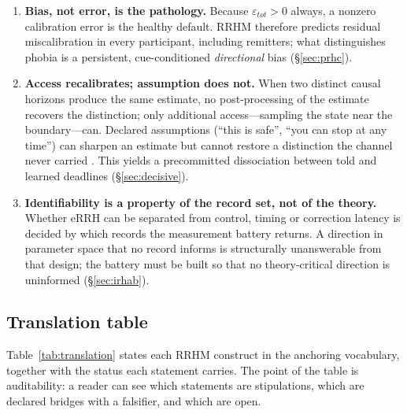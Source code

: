 \documentclass[9pt,twocolumn]{article}
\newcommand{\eRRH}{\mathrm{eRRH}}
\begin{document}
\begin{enumerate}[leftmargin=1.5em]
\item \textbf{Bias, not error, is the pathology.} Because $\varepsilon_{tot}>0$ always, a nonzero calibration error is the healthy default. RRHM therefore predicts residual miscalibration in every participant, including remitters; what distinguishes phobia is a persistent, cue-conditioned \emph{directional} bias (\S\ref{sec:prhc}).
\item \textbf{Access recalibrates; assumption does not.} When two distinct causal horizons produce the same estimate, no post-processing of the estimate recovers the distinction; only additional access---sampling the state near the boundary---can. Declared assumptions (``this is safe'', ``you can stop at any time'') can sharpen an estimate but cannot restore a distinction the channel never carried \cite{lahtee2026rc}. This yields a precommitted dissociation between told and learned deadlines (\S\ref{sec:decisive}).
\item \textbf{Identifiability is a property of the record set, not of the theory.} Whether $\eRRH$ can be separated from control, timing or correction latency is decided by which records the measurement battery returns. A direction in parameter space that no record informs is structurally unanswerable from that design; the battery must be built so that no theory-critical direction is uninformed (\S\ref{sec:irhab}).
\end{enumerate}

\subsection{Translation table}
Table~\ref{tab:translation} states each RRHM construct in the anchoring vocabulary, together with the status each statement carries. The point of the table is auditability: a reader can see which statements are stipulations, which are declared bridges with a falsifier, and which are open.
\end{document}
